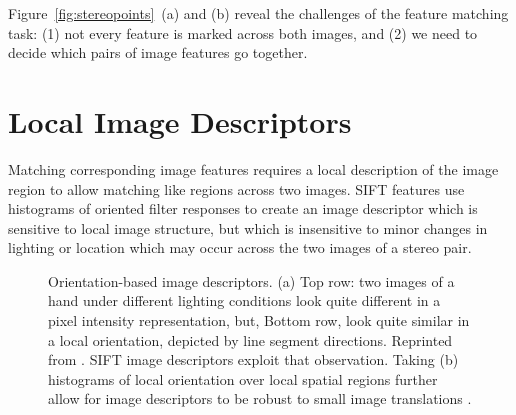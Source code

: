 Figure~\ref{fig:stereopoints}~(a) and (b) reveal the challenges of the feature matching task:  (1) not every feature is marked across both images, and (2) we need to decide which pairs of image features go together.

\section{Local Image Descriptors}

Matching corresponding image features requires a local description of the image region to allow matching like regions across two images.  SIFT features  \cite{Lowe04} use histograms of oriented filter responses to create an image descriptor which is sensitive to local image structure, but which is insensitive to minor changes in lighting or location which may occur across the two images of a stereo pair.


\begin{figure}
    \centerline{
    }
    \caption{Orientation-based image descriptors.  (a) Top row:  two images of a hand under different lighting conditions look quite different in a pixel intensity representation, but, Bottom row, look quite similar in a local orientation, depicted by line segment directions.  Reprinted from \cite{Freeman98c}.  SIFT image descriptors \cite{Lowe04} exploit that observation.  Taking (b) histograms of local orientation over local spatial regions further allow for image descriptors to be robust to small image translations \cite{Freeman98c,Lowe04}.  }
    \label{fig:SIFT}
\end{figure}

